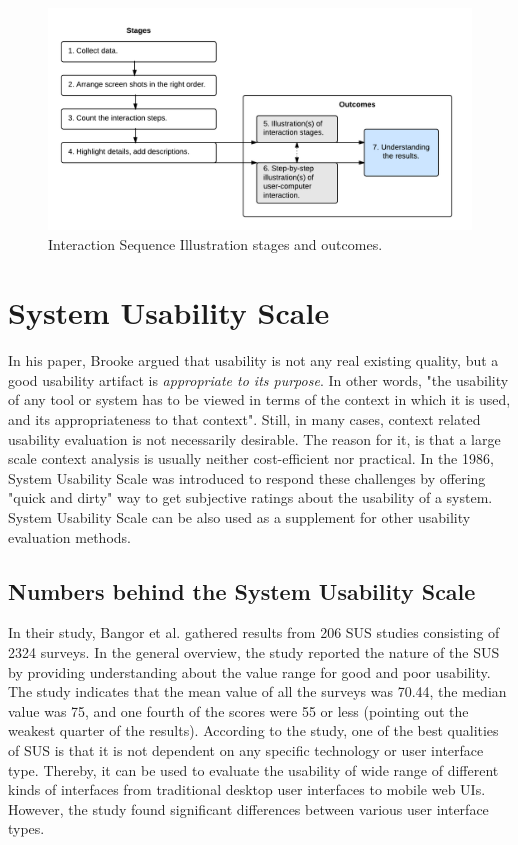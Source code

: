 \documentclass[12pt,a4paper,oneside,pdftex]{report}
\begin{document}
\begin{figure}[H]
  	\centerline{
  	\includegraphics[width=1.3\textwidth]{./images/isi_chart.png}
  	}
  	\caption{Interaction Sequence Illustration stages and outcomes.}
	\label{fig:isi_chart}
\end{figure}

\section{System Usability Scale}
\label{sec:sus}
In his paper, Brooke \citep{RefWorks:10} argued that usability is not any real existing quality, but a good usability artifact is \emph{appropriate to its purpose}. In other words, "the usability of any tool or system has to be viewed in terms of the context in which it is used, and its appropriateness to that context"\citep{RefWorks:10}. Still, in many cases, context related usability evaluation is not necessarily desirable. The reason for it, is that a large scale context analysis is usually neither cost-efficient nor practical.\citep{RefWorks:10} In the 1986, System Usability Scale was introduced to respond these challenges by offering "quick and dirty"\citep{RefWorks:10} way to get subjective ratings about the usability of a system. \citep{RefWorks:12, RefWorks:35} System Usability Scale can be also used as a supplement for other usability evaluation methods.




\subsection{Numbers behind the System Usability Scale}

In their study, Bangor et al. gathered results from 206 SUS studies consisting of 2324 surveys. In the general overview, the study reported the nature of the SUS by providing understanding about the value range for good and poor usability. The study indicates that the mean value of all the surveys was 70.44, the median value was 75, and one fourth of the scores were 55 or less (pointing out the weakest quarter of the results). According to the study, one of the best qualities of SUS is that it is not dependent on any specific technology or user interface type. Thereby, it can be used to evaluate the usability of wide range of different kinds of interfaces from traditional desktop user interfaces to mobile web UIs. However, the study found significant differences between various user interface types. \citep{RefWorks:12}	
\end{document}
